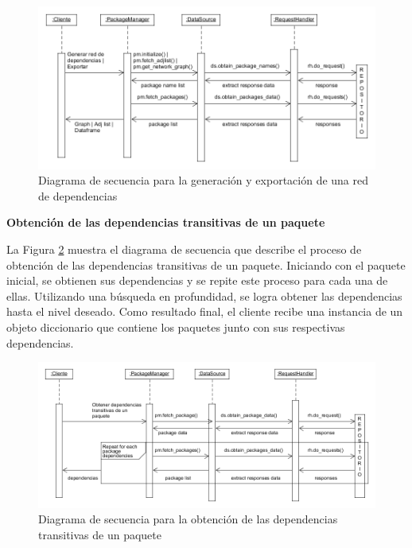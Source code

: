 \begin{figure}[ht!]
    \centering
    \includegraphics[width=1.2\textwidth]{img/anexos/secuencia_exportar.png}
    \caption{Diagrama de secuencia para la generación y exportación de una red de dependencias}
    \label{fig:secuencia_exportar}
\end{figure}

\textbf{Obtención de las dependencias transitivas de un paquete}

La Figura \ref{fig:secuencia_transitiva} muestra el diagrama de secuencia que describe el proceso de
obtención de las dependencias transitivas de un paquete. Iniciando con el paquete inicial, se obtienen
sus dependencias y se repite este proceso para cada una de ellas. Utilizando una búsqueda en profundidad,
se logra obtener las dependencias hasta el nivel deseado. Como resultado final, el cliente recibe una
instancia de un objeto diccionario que contiene los paquetes junto con sus respectivas dependencias.

\begin{figure}[ht!]
    \centering
    \includegraphics[width=1.2\textwidth]{img/anexos/secuencia_transitiva.png}
    \caption{Diagrama de secuencia para la obtención de las dependencias transitivas de un paquete}
    \label{fig:secuencia_transitiva}
\end{figure}